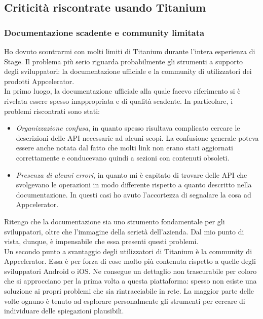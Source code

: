 		\subsection{Criticità riscontrate usando Titanium}
			\subsubsection{Documentazione scadente e community limitata}
				Ho dovuto scontrarmi con molti limiti di Titanium durante l'intera esperienza di Stage. Il problema più serio
				riguarda probabilmente gli strumenti a supporto degli sviluppatori: la documentazione ufficiale e la community di
				utilizzatori dei prodotti Appcelerator.\\
				In primo luogo, la documentazione ufficiale alla quale facevo riferimento si è rivelata essere spesso inappropriata e
				di qualità scadente. In particolare, i problemi riscontrati sono stati:
				\begin{itemize}
					\item \emph{Organizzazione confusa}, in quanto spesso risultava complicato cercare le descrizioni delle API
					necessarie ad alcuni scopi. La confusione generale poteva essere anche notata dal fatto che molti link non
					erano stati aggiornati correttamente e conducevano quindi a sezioni con contenuti obsoleti.
					\item \emph{Presenza di alcuni errori}, in quanto mi è capitato di trovare delle API che svolgevano le
					operazioni in modo differente rispetto a quanto descritto nella documentazione. In questi casi ho avuto
					l'accortezza di segnalare la cosa ad Appcelerator.
				\end{itemize}
				Ritengo che la documentazione sia uno strumento fondamentale per gli sviluppatori, oltre che l'immagine della serietà
				dell'azienda. Dal mio punto di vista, dunque, è impensabile che essa presenti questi problemi.\\
				Un secondo punto a svantaggio degli utilizzatori di Titanium è la community di Appcelerator. Essa è per forza di cose
				molto più contenuta rispetto a quelle degli sviluppatori Android o iOS. Ne consegue un dettaglio non trascurabile per
				coloro che si approcciano per la prima volta a questa piattaforma: spesso non esiste una soluzione ai propri problemi
				che sia rintracciabile in rete. La maggior parte delle volte ognuno è tenuto ad esplorare personalmente gli strumenti
				per cercare di individuare delle spiegazioni plausibili.

